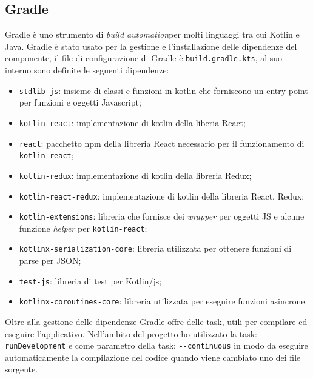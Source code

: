 \subsection{Gradle}
Gradle è uno strumento di \emph{build automation}\glosp per molti linguaggi tra cui Kotlin e Java. Gradle è stato usato per la gestione e l'installazione delle dipendenze del componente, il file di configurazione di Gradle è \verb|build.gradle.kts|, al suo interno sono definite le seguenti dipendenze:
\begin{itemize}
	\item \verb|stdlib-js|: insieme di classi e funzioni in kotlin che forniscono un entry-point per funzioni e oggetti Javascript;
	
	\item \verb|kotlin-react|: implementazione di kotlin della liberia React;
	
	\item \verb|react|: pacchetto npm della libreria React necessario per il funzionamento di \verb|kotlin-react|;
	
	\item \verb|kotlin-redux|: implementazione di kotlin della libreria Redux;
	
	\item \verb|kotlin-react-redux|: implementazione di kotlin della libreria React, Redux;
	
	\item \verb|kotlin-extensions|: libreria che fornisce dei \emph{wrapper} per oggetti JS e alcune funzione \emph{helper} per \verb|kotlin-react|;
	
	\item \verb|kotlinx-serialization-core|: libreria utilizzata per ottenere funzioni di parse per JSON;
	
	\item \verb|test-js|: libreria di test per Kotlin/js;
	
	\item \verb|kotlinx-coroutines-core|: libreria utilizzata per eseguire funzioni asincrone.
\end{itemize}
\noindent
Oltre alla gestione delle dipendenze Gradle offre delle task, utili per compilare ed eseguire l'applicativo. Nell'ambito del progetto ho utilizzato la task: \verb|runDevelopment| e come parametro della task: \verb|--continuous| in modo da eseguire automaticamente la compilazione del codice quando viene cambiato uno dei file sorgente.

